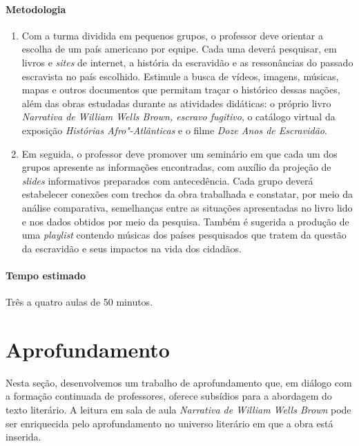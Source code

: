 \documentclass[12pt]{extarticle}
\begin{document}
 \paragraph{Metodologia}
   \begin{enumerate}
    \item
    Com a turma dividida em pequenos grupos, o professor deve orientar
    a escolha de um país americano por equipe. Cada uma deverá pesquisar, em livros e
  \emph{sites} de internet, a história da escravidão e as ressonâncias
  do passado escravista no país escolhido. Estimule a busca de vídeos,
  imagens, músicas, mapas e outros documentos que permitam traçar o
  histórico dessas nações, além das obras estudadas durante as atividades 
  didáticas: o próprio livro \emph{Narrativa de William Wells Brown, escravo fugitivo},
  o catálogo virtual da exposição \emph{Histórias Afro"-Atlânticas} e o filme
  \emph{Doze Anos de Escravidão}.

    \item
    Em seguida, o professor deve promover um seminário em
  que cada um dos grupos apresente as informações encontradas, com
  auxílio da projeção de \emph{slides} informativos preparados com
  antecedência. Cada grupo deverá estabelecer conexões com trechos da
  obra trabalhada e constatar, por meio da análise comparativa,
  semelhanças entre as situações apresentadas no livro lido e nos dados
  obtidos por meio da pesquisa. Também é sugerida a produção de uma
  \emph{playlist} contendo músicas dos países pesquisados que tratem 
  da questão da escravidão e seus impactos na vida dos cidadãos.

   \end{enumerate}

 \paragraph{Tempo estimado} Três a quatro aulas de 50 minutos.




\section{Aprofundamento}


Nesta seção, desenvolvemos um trabalho de aprofundamento que, em diálogo
com a formação continuada de professores, oferece subsídios para a
abordagem do texto literário. A leitura em sala de aula \emph{Narrativa
de William Wells Brown} pode ser enriquecida pelo aprofundamento no
universo literário em que a obra está inserida.
\end{document}
